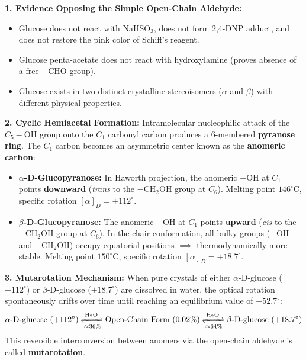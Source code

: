 \documentclass[10pt,a4paper]{article}
\begin{document}
\begin{conceptbox}
\textbf{1. Evidence Opposing the Simple Open-Chain Aldehyde:}
\begin{itemize}
  \item Glucose does not react with $\mathrm{NaHSO_3}$, does not form 2,4-DNP adduct, and does not restore the pink color of Schiff's reagent.
  \item Glucose penta-acetate does not react with hydroxylamine (proves absence of a free $-\mathrm{CHO}$ group).
  \item Glucose exists in two distinct crystalline stereoisomers ($\alpha$ and $\beta$) with different physical properties.
\end{itemize}
\textbf{2. Cyclic Hemiacetal Formation:}
Intramolecular nucleophilic attack of the $C_5-\mathrm{OH}$ group onto the $C_1$ carbonyl carbon produces a 6-membered \textbf{pyranose ring}. The $C_1$ carbon becomes an asymmetric center known as the \textbf{anomeric carbon}:
\begin{itemize}
  \item \textbf{$\alpha$-D-Glucopyranose:} In Haworth projection, the anomeric $-\mathrm{OH}$ at $C_1$ points \textbf{downward} (\textit{trans} to the $-\mathrm{CH_2OH}$ group at $C_6$). Melting point $146^\circ\text{C}$, specific rotation $[\alpha]_D = +112^\circ$.
  \item \textbf{$\beta$-D-Glucopyranose:} The anomeric $-\mathrm{OH}$ at $C_1$ points \textbf{upward} (\textit{cis} to the $-\mathrm{CH_2OH}$ group at $C_6$). In the chair conformation, all bulky groups ($-\mathrm{OH}$ and $-\mathrm{CH_2OH}$) occupy equatorial positions $\implies$ thermodynamically more stable. Melting point $150^\circ\text{C}$, specific rotation $[\alpha]_D = +18.7^\circ$.
\end{itemize}
\textbf{3. Mutarotation Mechanism:}
When pure crystals of either $\alpha$-D-glucose ($+112^\circ$) or $\beta$-D-glucose ($+18.7^\circ$) are dissolved in water, the optical rotation spontaneously drifts over time until reaching an equilibrium value of \textbf{$+52.7^\circ$}:
\begin{equation}
  \alpha\text{-D-glucose } (+112^\circ) \xrightleftharpoons[\approx 36\%]{\mathrm{H_2O}} \text{Open-Chain Form } (0.02\%) \xrightleftharpoons[\approx 64\%]{\mathrm{H_2O}} \beta\text{-D-glucose } (+18.7^\circ)
\end{equation}
This reversible interconversion between anomers via the open-chain aldehyde is called \textbf{mutarotation}.
\end{conceptbox}
\end{document}

